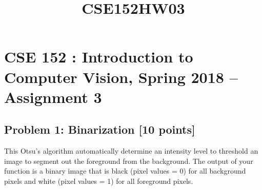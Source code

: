 \documentclass[11pt]{article}
\title{CSE152HW03}
\begin{document}
    
    
    \maketitle
    
    

    
    \section{CSE 152 : Introduction to Computer Vision, Spring 2018 --
Assignment
3}\label{cse-152-introduction-to-computer-vision-spring-2018-assignment-3}

    \subsection{Problem 1: Binarization {[}10
points{]}}\label{problem-1-binarization-10-points}

This Otsu's algorithm automatically determine an intensity level to
threshold an image to segment out the foreground from the background.
The output of your function is a binary image that is black (pixel
values = 0) for all background pixels and white (pixel values = 1) for
all foreground pixels.
\end{document}
